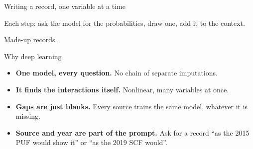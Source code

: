 \documentclass[11pt,aspectratio=169]{beamer}
\newcommand{\slidenote}[1]{\par\vfill{\scriptsize\color{yalegrey}#1}}
\begin{document}
\begin{frame}{Writing a record, one variable at a time}
  \centering

  \vspace{1.2em}
  Each step: ask the model for the probabilities, draw one, add it to the context.
  \slidenote{Made-up records.}
\end{frame}

\begin{frame}{Why deep learning}
  \begin{itemize}
    \item \textbf{One model, every question.} No chain of separate imputations.
    \vspace{0.4em}
    \item \textbf{It finds the interactions itself.} Nonlinear, many variables at once.
    \vspace{0.4em}
    \item \textbf{Gaps are just blanks.} Every source trains the same model, whatever it is missing.
    \vspace{0.4em}
    \item \textbf{Source and year are part of the prompt.} Ask for a record ``as the 2015 PUF would show it'' or ``as the 2019 SCF would''.
  \end{itemize}
\end{frame}

\end{document}
